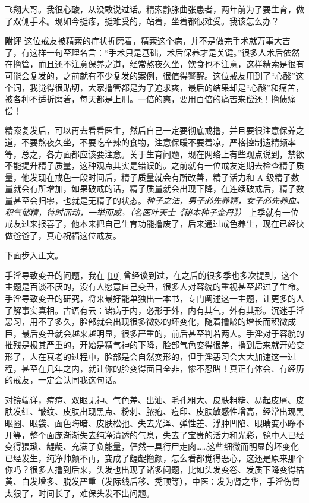 \begin{case}
    飞翔大哥。我很心酸，从没敢说过话。精索静脉曲张患者，两年前为了要生育，做了双侧手术。现如今挺疼，挺难受的，站着，坐着都很难受。我该怎么办？

    \textbf{附评} 这位戒友被精索的症状折磨着，精索这个病，并不是做完手术就万事大吉了，有这样一句至理名言：“手术只是基础，术后保养才是关键。”很多人术后依然在撸管，而且还不注意保养之道，经常熬夜久坐，饮食也不注意，这样精索是很有可能会复发的，之前就有不少复发的案例，很值得警醒。这位戒友用到了“心酸”这个词，我觉得很贴切，大家撸管都是为了追求爽，最后的结果却是“心酸”和痛苦，被各种不适折磨着，每天都是上刑。一倍的爽，要用百倍的痛苦来偿还！撸债痛偿！

    精索复发后，可以再去看看医生，然后自己一定要彻底戒撸，并且要很注意保养之道，不要熬夜久坐，不要吃辛辣的食物，注意保暖不要着凉，严格控制遗精频率等，总之，各方面都应该要注意。关于生育问题，现在网络上有些观点说到，禁欲不能提升精子质量，这种观点其实是错误的。之前就有一位戒友定期去检查精子质量，他发现在戒色一段时间后，精子质量就会有所改善，精子活力和 A 级精子数量就会有所增加，如果破戒的话，精子质量就会出现下降，在连续破戒后，精子数量甚至会归零，也就是无精子的状态。\textit{种子之法，男子必先养精，女子必先养血。积气储精，待时而动，一举而成。（名医叶天士《秘本种子金丹》）} 上季就有一位戒友过来报喜了，他本来把自己生育功能撸废了，后来通过戒色养生，现在已经快做爸爸了，真心祝福这位戒友。
\end{case}

下面步入正文。

手淫导致变丑的问题，我在 \ref{10} 曾经谈到过，在之后的很多季也多次提到，这个主题是百谈不厌的，没有人愿意自己变丑，很多人对容貌的重视甚至超过了生命。手淫导致变丑的研究，将来最好能单独出一本书，专门阐述这一主题，让更多的人了解事实真相。古语有云：诸病于内，必形于外，内有其气，外有其形。沉迷手淫恶习，用不了多久，脸部就会出现很多微妙的坏变化，随着撸龄的增长而积微成巨，最后变丑就会越来越明显，很多严重的，前后甚至判若两人。手淫对于容貌的摧残是极其严重的，开始是精气神的下降，脸部气色变得很差，撸到后来就开始变形了，人在衰老的过程中，脸部是会自然变形的，但手淫恶习会大大加速这一过程，甚至在几年之内，就让你的脸变得面目全非，惨不忍睹！真正有体会、有经历的戒友，一定会认同我这句话。

对镜端详，痘痘、双眼无神、气色差、出油、毛孔粗大、皮肤粗糙、易起皮屑、皮肤发红、皱纹、皮肤出现黑点、粉刺、脓疱、痘印、皮肤敏感性增高，经常出现黑眼圈、眼袋、面色晦暗、皮肤松弛、失去光泽、弹性差、浮肿凹陷、眼睛变小睁不开等，整个面庞渐渐失去纯净清透的气息，失去了宝贵的活力和光彩，镜中人已经变得猥琐、龌龊、充满了负能量，俨然一具行尸走肉……这些细微而明显的坏变化已经发生，纯净帅颜不再，变成了龌龊撸颜，怎么看都觉得恶心，这还是原来那个你吗？很多人撸到后来，头发也出现了诸多问题，比如头发变卷、发质下降变得枯黄、白发增多、脱发严重（发际线后移、秃顶等），中医：发为肾之华，手淫伤肾太狠了，时间长了，难保头发不出问题。

